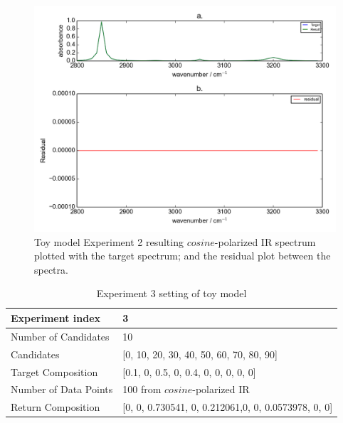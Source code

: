 \begin{figure}[!ht] 
\includegraphics[scale=0.7]{Figures/toy_model_result_plotting_ir_cos_4candi_1.png}
\caption{Toy model Experiment 2 resulting $cosine$-polarized IR spectrum plotted with the target spectrum; and the residual plot between the spectra.}
\label{fig:3.2}
\end{figure}

\begin{table} 
\begin{tabular}{| l | p{7cm} | }
\hline
Experiment index & 3  \\
\hline
Number of Candidates & 10   \\
\hline
Candidates & [0, 10, 20, 30, 40, 50, 60, 70, 80, 90]  \\
\hline
Target Composition & [0.1, 0, 0.5, 0, 0.4, 0, 0, 0, 0, 0] \\
\hline
Number of Data Points & 100 from $cosine$-polarized IR \\
\hline
Return Composition & [0, 0, 0.730541, 0, 0.212061,0, 0, 0.0573978, 0, 0] \\
\hline
\end{tabular}
\caption{Experiment 3 setting of toy model}
\label{tab:3.2}
\end{table}	

